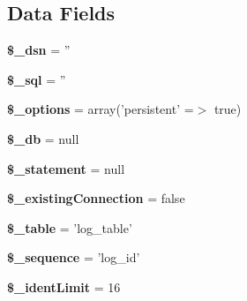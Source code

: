 \subsection*{Data Fields}
\begin{DoxyCompactItemize}
\item 
\hypertarget{class_log__sql_a842a801d5b4d97f2e2cd172fbc3f116e}{
{\bfseries \$\_\-dsn} = ''}
\label{class_log__sql_a842a801d5b4d97f2e2cd172fbc3f116e}

\item 
\hypertarget{class_log__sql_ac5a32501c0b92ebc525dca40b2cb105a}{
{\bfseries \$\_\-sql} = ''}
\label{class_log__sql_ac5a32501c0b92ebc525dca40b2cb105a}

\item 
\hypertarget{class_log__sql_a1bebdc689c84eee59ad24c77e5531762}{
{\bfseries \$\_\-options} = array('persistent' =$>$ true)}
\label{class_log__sql_a1bebdc689c84eee59ad24c77e5531762}

\item 
\hypertarget{class_log__sql_abc686c23af6ae116b72bc6adb4482a1f}{
{\bfseries \$\_\-db} = null}
\label{class_log__sql_abc686c23af6ae116b72bc6adb4482a1f}

\item 
\hypertarget{class_log__sql_a6e089a814eefb25cf20f7cc134baa4dc}{
{\bfseries \$\_\-statement} = null}
\label{class_log__sql_a6e089a814eefb25cf20f7cc134baa4dc}

\item 
\hypertarget{class_log__sql_a367f16baa4347d6a379c16cdde44ab9b}{
{\bfseries \$\_\-existingConnection} = false}
\label{class_log__sql_a367f16baa4347d6a379c16cdde44ab9b}

\item 
\hypertarget{class_log__sql_ac0ee5b766d19cb282552a3449a1f8376}{
{\bfseries \$\_\-table} = 'log\_\-table'}
\label{class_log__sql_ac0ee5b766d19cb282552a3449a1f8376}

\item 
\hypertarget{class_log__sql_a7b229bf7d4c492bd1fd5e4507f45526d}{
{\bfseries \$\_\-sequence} = 'log\_\-id'}
\label{class_log__sql_a7b229bf7d4c492bd1fd5e4507f45526d}

\item 
\hypertarget{class_log__sql_a033a0ea8689599058dfe9f97bf5be490}{
{\bfseries \$\_\-identLimit} = 16}
\label{class_log__sql_a033a0ea8689599058dfe9f97bf5be490}

\end{DoxyCompactItemize}


